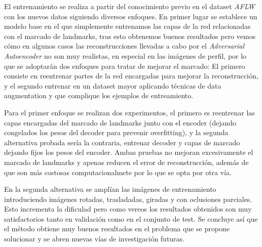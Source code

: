 \medskip

\noindent El entrenamiento se realiza a partir del conocimiento previo en el dataset \textit{AFLW} con los nuevos datos siguiendo diversos enfoques. En primer lugar se establece un modelo base en el que simplemente entrenamos las capas de la red relacionadas con el marcado de landmarks, tras esto obtenemos buenos resultados pero vemos cómo en algunos casos las reconstrucciones llevadas a cabo por el \textit{Adversarial Autoencoder} no son muy realistas, en especial en las imágenes de perfil, por lo que se adoptarán dos enfoques para tratar de mejorar el marcado: El primero consiste en reentrenar partes de la red encargadas para mejorar la reconstrucción, y el segundo entrenar en un dataset mayor aplicando técnicas de data augmentation y que complique los ejemplos de entreamiento. 

\medskip 

\noindent Para el primer enfoque se realizan dos experimentos, el primero es reentrenar las capas encargadas del marcado de landmarks junto con el encoder (dejando congelados los pesos del decoder para prevenir overfitting), y la segunda alternativa probada sería la contraria, entrenar decoder y capas de marcado dejando fijos los pesos del encoder. Ambas pruebas no mejoran excesivamente el marcado de landmarks y apenas reducen el error de reconstrucción, además de que son más costosas computacionalmete por lo que se opta por otra vía. 

\medskip

\noindent En la segunda alternativa se amplían las imágenes de entrenamiento introduciendo imágenes rotadas, trasladadas, giradas y con oclusiones parciales. Esto incrementa la dificulad pero como vereos los resultados obtenidos son muy satisfactorios tanto en validación como en el conjunto de test. Se concluye así que el método obtiene muy buenos resultados en el problema que se propone solucionar y se abren nuevas vías de investigación futuras.

\endinput
